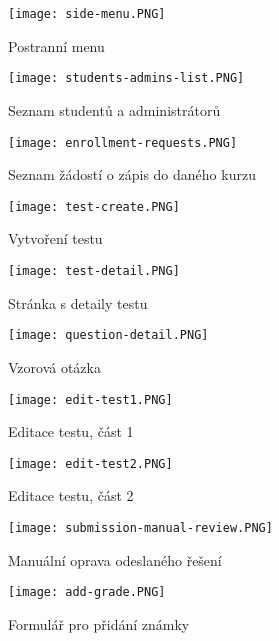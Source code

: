 \begin{figure}
	\centering
	\texttt{[image: side-menu.PNG]}
	\caption{Postranní menu}
	\label{fig:side-menu}
\end{figure}

\begin{figure}
	\centering
	\texttt{[image: students-admins-list.PNG]}
	\caption{Seznam studentů a administrátorů}
	\label{fig:students-admins-list}
\end{figure}

\begin{figure}
	\centering
	\texttt{[image: enrollment-requests.PNG]}
	\caption{Seznam žádostí o zápis do daného kurzu}
	\label{fig:enrollment-requests}
\end{figure}

\begin{figure}
	\centering
	\texttt{[image: test-create.PNG]}
	\caption{Vytvoření testu}
	\label{fig:test-create}
\end{figure}

\begin{figure}
	\centering
	\texttt{[image: test-detail.PNG]}
	\caption{Stránka s detaily testu}
	\label{fig:test-detail}
\end{figure}

\begin{figure}
	\centering
	\texttt{[image: question-detail.PNG]}
	\caption{Vzorová otázka}
	\label{fig:question-detail}
\end{figure}

\begin{figure}
	\centering
	\texttt{[image: edit-test1.PNG]}
	\caption{Editace testu, část 1}
	\label{fig:test-edit1}
\end{figure}

\begin{figure}
	\centering
	\texttt{[image: edit-test2.PNG]}
	\caption{Editace testu, část 2}
	\label{fig:test-edit2}
\end{figure}

\begin{figure}
	\centering
	\texttt{[image: submission-manual-review.PNG]}
	\caption{Manuální oprava odeslaného řešení}
	\label{fig:submission-manual-review}
\end{figure}

\begin{figure}
	\centering
	\texttt{[image: add-grade.PNG]}
	\caption{Formulář pro přidání známky}
	\label{fig:grade-add}
\end{figure}